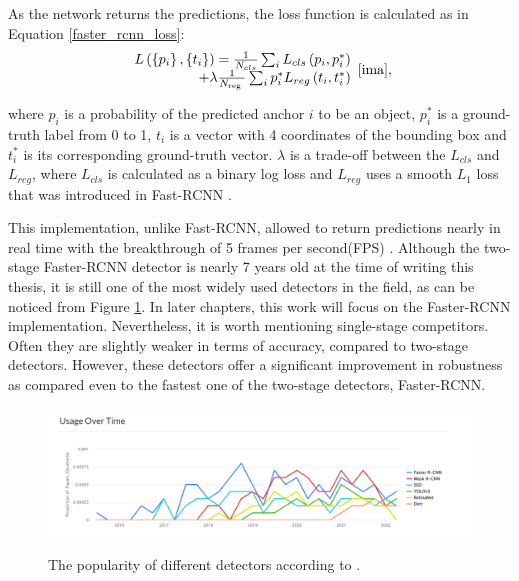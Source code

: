 As the network returns the predictions, the loss function is calculated as in Equation \ref{faster_rcnn_loss}:  
\begin{equation}
\begin{array}{r}
L\left(\left\{p_{i}\right\},\left\{t_{i}\right\}\right)=\frac{1}{N_{c l s}} \sum_{i} L_{c l s}\left(p_{i}, p_{i}^{*}\right) \\
+\lambda \frac{1}{N_{\text {reg }}} \sum_{i} p_{i}^{*} L_{r e g}\left(t_{i}, t_{i}^{*}\right)
\end{array}
\label{faster_rcnn_loss} 
\cite{ima},
\end{equation}

where $p_i$ is a probability of the predicted anchor $i$ to be an object,  $p_{i}^{*}$ is a ground-truth label from 0 to 1, $t_i$ is a vector with 4 coordinates of the bounding box and $t_{i}^{*}$ is its corresponding ground-truth vector. $\lambda$ is a trade-off between the $L_{cls}$ and $L_{reg}$, where $L_{c l s}$ is calculated as a binary log loss and $L_{reg}$ uses a smooth $L_1$ loss that was introduced in Fast-RCNN \cite{Girshick2015}.  




This implementation, unlike Fast-RCNN, allowed to return predictions nearly in real time with the breakthrough of 5 frames per second(FPS) \cite{ima}.
Although the two-stage Faster-RCNN detector is nearly 7 years old at the time of writing this thesis, it is still one of the most widely used detectors in the field, as can be noticed from Figure \ref{popularity}. In later chapters, this work will focus on the Faster-RCNN implementation. Nevertheless, it is worth mentioning single-stage competitors. Often they are slightly weaker in terms of accuracy, compared to two-stage detectors. However, these detectors offer a significant improvement in robustness as compared even to the fastest one of the two-stage detectors, Faster-RCNN. 

\begin{figure}[htb]
	\begin{center}
		\includegraphics[width=14cm]{./detectorsPopularity.png}
	\end{center}
	\caption{The popularity of different detectors according to  \cite{paperswithcode_1:2022}.}
	\begin{center}
		\label{popularity}
	\end{center}
\end{figure}
\FloatBarrier



